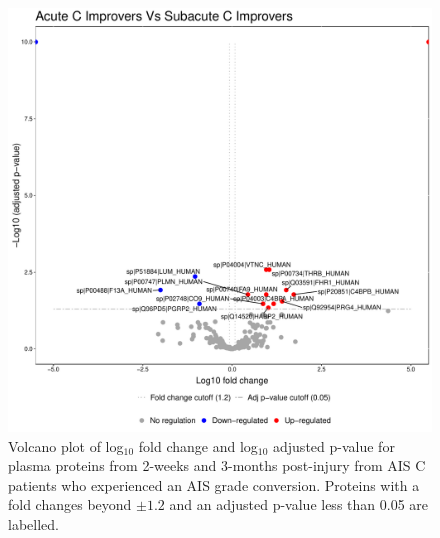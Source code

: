 \documentclass[9pt,lineno]{elife}
\begin{document}
\begin{figure}
\includegraphics[width=1\linewidth]{figures/openms_protein_quantification/label_free/volcano_plots/openms_volcano_plot_2021-08-10_0011} \caption{Volcano plot of log\(_10\) fold change and log\(_10\) adjusted p-value for plasma proteins from 2-weeks and 3-months post-injury from AIS C patients who experienced an AIS grade conversion. Proteins with a fold changes beyond \(\pm 1.2\) and an adjusted p-value less than 0.05 are labelled.}\label{fig:volc-plot-acute-c-imp-vs-subacute-imp}
\end{figure}
\end{document}
